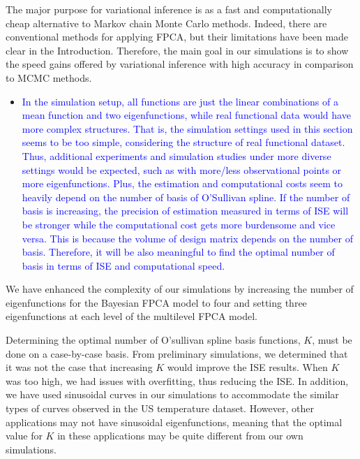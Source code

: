 \documentclass[12pt]{article}
\theoremstyle{plain}
\theoremstyle{definition}
\theoremstyle{remark}
\begin{document}
\vspace{1\baselineskip}

The major purpose for variational inference is as a fast and computationally cheap alternative to Markov chain
Monte Carlo methods. Indeed, there are conventional methods for applying FPCA, but their limitations have been
made clear in the Introduction. Therefore, the main goal in our simulations is to show the speed gains offered by
variational inference with high accuracy in comparison to MCMC methods.

\vspace{2\baselineskip}

\begin{itemize}
	\item[\textcolor{blue}{\textbullet}] \textcolor{blue}{
		In the simulation setup, all functions are just the linear combinations of a mean function and two eigenfunctions,
		while real functional data would have more complex structures. That is, the simulation settings used in this
		section seems to be too simple, considering the structure of real functional dataset. Thus, additional experiments
		and simulation studies under more diverse settings would be expected, such as with more/less observational
		points or more eigenfunctions. Plus, the estimation and computational costs seem to heavily depend on the number
		of basis of O’Sullivan spline. If the number of basis is increasing, the precision of estimation measured in terms
		of ISE will be stronger while the computational cost gets more burdensome and vice versa. This is because the
		volume of design matrix depends on the number of basis. Therefore, it will be also meaningful to find the optimal
		number of basis in terms of ISE and computational speed.
	}
\end{itemize}

\vspace{1\baselineskip}

We have enhanced the complexity of our simulations by increasing the number of eigenfunctions for the Bayesian
FPCA model to four and setting three eigenfunctions at each level of the multilevel FPCA model.

\vspace{1\baselineskip}

Determining the optimal number of O'sullivan spline basis functions, $K$, must be done on a case-by-case basis.
From preliminary simulations, we determined that it was not the case that increasing $K$ would improve the
ISE results. When $K$ was too high, we had issues with overfitting, thus reducing the ISE. In addition, we have used
sinusoidal curves in our simulations to accommodate the similar types of curves observed in the US temperature dataset.
However, other applications may not have sinusoidal eigenfunctions, meaning that the optimal value for $K$ in these applications
may be quite different from our own simulations.
\end{document}
